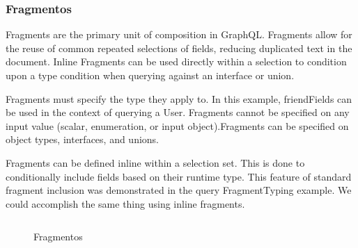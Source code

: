 \subsubsection[Fragmentos]{Fragmentos}

Fragments are the primary unit of composition in GraphQL. Fragments allow for the reuse of common repeated selections of fields, reducing duplicated text in the document. Inline Fragments can be used directly within a selection to condition upon a type condition when querying against an interface or union.

Fragments must specify the type they apply to. In this example, friendFields can be used in the context of querying a User. Fragments cannot be specified on any input value (scalar, enumeration, or input object).Fragments can be specified on object types, interfaces, and unions.

Fragments can be defined inline within a selection set. This is done to conditionally include fields based on their runtime type. This feature of standard fragment inclusion was demonstrated in the query FragmentTyping example. We could accomplish the same thing using inline fragments.

\begin{figure}[H]
  \centering
  \inputminted[frame=single,framesep=10pt]{javascript}{anexos/graphql-fragment.graphql}
  \caption{Fragmentos}
\end{figure}
